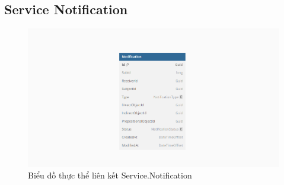 \documentclass[../index.tex]{subfiles}
\begin{document}
    \subsection{Service Notification}
    \begin{figure}[H]
        \centering
        \includegraphics[width=0.85\linewidth]{
            ../figures/service-notification_erd.png
        }
        \caption{Biểu đồ thực thể liên kết Service.Notification}
        \label{fig:service-notification-erd}
    \end{figure}
\end{document}
